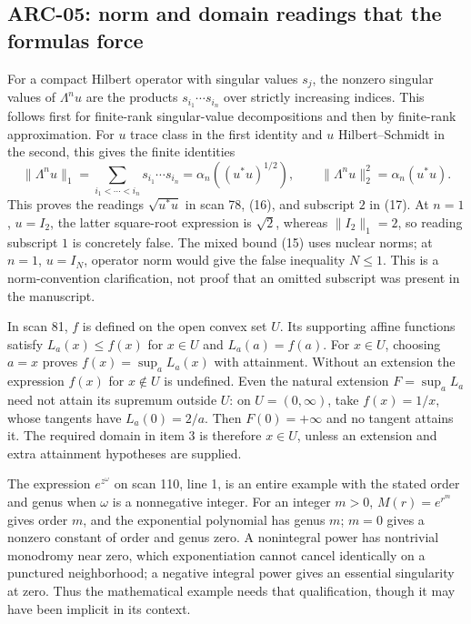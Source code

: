 \subsection{ARC-05: norm and domain readings that the formulas force}
For a compact Hilbert operator with singular values $s_j$, the nonzero singular values of $\Lambda^n u$ are the products $s_{i_1}\cdots s_{i_n}$ over strictly increasing indices. This follows first for finite-rank singular-value decompositions and then by finite-rank approximation. For $u$ trace class in the first identity and $u$ Hilbert--Schmidt in the second, this gives the finite identities
\[
 \|\Lambda^n u\|_1=\sum_{i_1<\cdots<i_n}s_{i_1}\cdots s_{i_n}
 =\alpha_n((u^*u)^{1/2}),\qquad
 \|\Lambda^n u\|_2^2=\alpha_n(u^*u).
\]
This proves the readings $\sqrt{u^*u}$ in scan 78, (16), and subscript $2$ in (17). At $n=1$, $u=I_2$, the latter square-root expression is $\sqrt2$, whereas $\|I_2\|_1=2$, so reading subscript $1$ is concretely false. The mixed bound (15) uses nuclear norms; at $n=1$, $u=I_N$, operator norm would give the false inequality $N\le1$. This is a norm-convention clarification, not proof that an omitted subscript was present in the manuscript.

In scan 81, $f$ is defined on the open convex set $U$. Its supporting affine functions satisfy $L_a(x)\le f(x)$ for $x\in U$ and $L_a(a)=f(a)$. For $x\in U$, choosing $a=x$ proves $f(x)=\sup_aL_a(x)$ with attainment. Without an extension the expression $f(x)$ for $x\notin U$ is undefined. Even the natural extension $F=\sup_aL_a$ need not attain its supremum outside $U$: on $U=(0,\infty)$, take $f(x)=1/x$, whose tangents have $L_a(0)=2/a$. Then $F(0)=+\infty$ and no tangent attains it. The required domain in item 3 is therefore $x\in U$, unless an extension and extra attainment hypotheses are supplied.

The expression $e^{z^\omega}$ on scan 110, line 1, is an entire example with the stated order and genus when $\omega$ is a nonnegative integer. For an integer $m>0$, $M(r)=e^{r^m}$ gives order $m$, and the exponential polynomial has genus $m$; $m=0$ gives a nonzero constant of order and genus zero. A nonintegral power has nontrivial monodromy near zero, which exponentiation cannot cancel identically on a punctured neighborhood; a negative integral power gives an essential singularity at zero. Thus the mathematical example needs that qualification, though it may have been implicit in its context.

